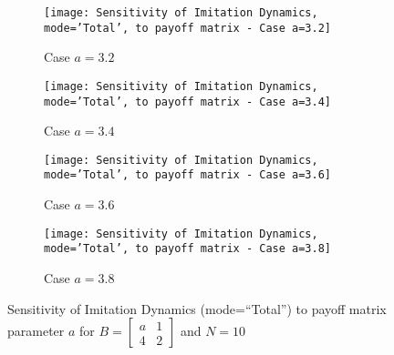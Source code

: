 	\begin{figure}[h]
		\centering
		\begin{subfigure}{.49\textwidth}
			\centering
			\texttt{[image: Sensitivity of Imitation Dynamics, mode='Total', to payoff matrix - Case a=3.2]}
			\caption{Case $a=3.2$}
			\label{fig:example30}
		\end{subfigure}
		\begin{subfigure}{.49\textwidth}
			\centering
			\texttt{[image: Sensitivity of Imitation Dynamics, mode='Total', to payoff matrix - Case a=3.4]}
			\caption{Case $a=3.4$}
			\label{fig:example31}
		\end{subfigure}
		\vspace{0.5em}
		\begin{subfigure}{.49\textwidth}
			\centering
			\texttt{[image: Sensitivity of Imitation Dynamics, mode='Total', to payoff matrix - Case a=3.6]}
			\caption{Case $a=3.6$}
			\label{fig:example32}
		\end{subfigure}
		\begin{subfigure}{.49\textwidth}
			\centering
			\texttt{[image: Sensitivity of Imitation Dynamics, mode='Total', to payoff matrix - Case a=3.8]}
			\caption{Case $a=3.8$}
			\label{fig:example33}
		\end{subfigure}
		\caption{Sensitivity of Imitation Dynamics (mode=``Total'') to payoff matrix parameter $a$ for $B = \begin{bmatrix} a & 1 \\ 4 & 2 \end{bmatrix}$ and $N=10$}
		\label{fig:Sensitivity of Imitation Dynamics, mode='Total', to payoff matrix}
	\end{figure}
